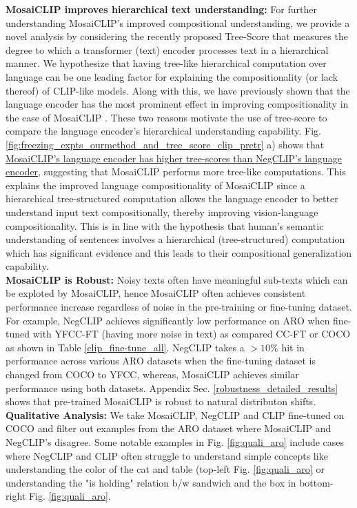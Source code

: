 \documentclass[11pt]{article}
\newcommand{\methodcomp}{MosaiCLIP}
\newcommand{\clip}{CLIP}
\newcommand{\negclip}{NegCLIP}
\begin{document}
\noindent\textbf{\methodcomp{} improves hierarchical text understanding:}
For further understanding \methodcomp{}'s improved compositional understanding, we provide a novel analysis by considering the recently proposed Tree-Score \citep{murty2022characterizing} that measures the degree to which a transformer (text) encoder processes text in a hierarchical manner. We hypothesize that having tree-like hierarchical computation over language can be one leading factor for explaining the compositionality (or lack thereof) of CLIP-like models. Along with this, we have previously shown that the language encoder has the most prominent effect in improving compositionality in the case of \methodcomp{} . These two reasons motivate the use of tree-score to compare the language encoder's hierarchical understanding capability. Fig. \ref{fig:freezing_expts_ourmethod_and_tree_score_clip_pretr} a) shows that \uline{\methodcomp{}'s language encoder has higher tree-scores than \negclip{}'s language encoder}, suggesting that \methodcomp{} performs more tree-like computations. This explains the improved language compositionality of \methodcomp{} since a hierarchical tree-structured computation allows the language encoder to better understand input text compositionally, thereby improving vision-language compositionality. This is in line with the hypothesis that human's semantic understanding of sentences involves a hierarchical (tree-structured) computation which has significant evidence \citep{crain,hale-etal-2018-finding,pallier2011cortical} and this leads to their compositional generalization capability.\\
\newline
\noindent \textbf{\methodcomp{} is Robust:}
Noisy texts often have meaningful sub-texts which can be exploted by \methodcomp{}, hence \methodcomp{} often achieves consistent performance increase regardless of noise in the pre-training or fine-tuning dataset. For example, \negclip{} achieves significantly low performance on ARO when fine-tuned with YFCC-FT (having more noise in text) as compared CC-FT or COCO as shown in Table \ref{clip_fine-tune_all}. \negclip{} takes a $>10\%$ hit in performance across various ARO datasets when the fine-tuning dataset is changed from COCO to YFCC, whereas, \methodcomp{} achieves similar performance using both datasets. Appendix Sec. \ref{robustness_detailed_results} shows that pre-trained MosaiCLIP is robust to natural distributon shifts.\\
\newline
\noindent \textbf{Qualitative Analysis:}
We take \methodcomp{}, \negclip{} and \clip{} fine-tuned on COCO and filter out examples from the ARO dataset where \methodcomp{} and \negclip{}'s disagree. Some notable examples in Fig. \ref{fig:quali_aro} include cases where \negclip{} and \clip{} often struggle to understand simple concepts like understanding the color of the cat and table ({top-left} Fig. \ref{fig:quali_aro} or understanding the "is holding" relation b/w sandwich and the box in {bottom-right} Fig. \ref{fig:quali_aro}.
\vspace{-0.3em}
\end{document}
